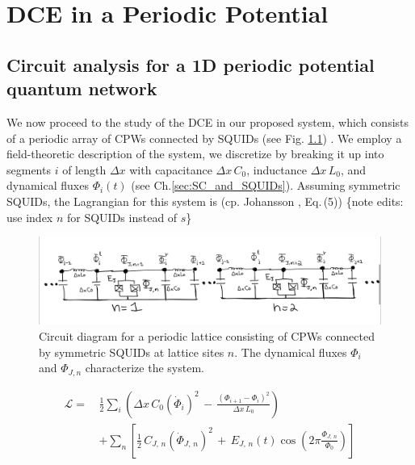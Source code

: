 \chapter{DCE in a Periodic Potential} \label{ch:system}


\section{Circuit analysis for a 1D periodic potential quantum network}\label{sec:circ_an}
%
\color{blue}
\noindent
We now proceed to the study of the DCE in our proposed system, which consists of a periodic array of CPWs connected by SQUIDs (see Fig. \ref{fig:circuit_diagram}) . We employ a field-theoretic description of the system, we discretize by breaking it up into segments $i$ of length $\Delta x$ with capacitance $\Delta x \, C_0$, inductance $\Delta x \, L_0$, and dynamical fluxes $\Phi_i(t)$ (see Ch.\ref{sec:SC_and_SQUIDs}).
Assuming symmetric SQUIDs, the Lagrangian for this system is (cp. Johansson \cite{Johansson2010_DCE}, Eq.\,(5))
\color{red} \{note edits: use index $n$ for SQUIDs instead of $s$\} \color{blue}
%
\begin{figure}[h]\label{fig:circuit_diagram}
    \centering
    \includegraphics[width=\textwidth, keepaspectratio]{figures/circuit_diagram.png}
    \caption{Circuit diagram for a periodic lattice consisting of CPWs connected by symmetric SQUIDs at lattice sites $n$. The dynamical fluxes $\Phi_i$ and $\Phi_{J,n}$ characterize the system.}
\end{figure}
%
\begin{equation} \label{eq:lagn1}
\begin{split}
\mathcal{L} = \, & \frac{1}{2} \sum_i \left( \Delta x \, C_{0} \left(\dot{\Phi}_{i}\right)^{2} \, - \, 
\frac{\left(\Phi_{i+1}-\Phi_{i}\right)^{2}}{\Delta x \, L_{0}} \right)  \\[2mm]
& + \sum_n \left[ \frac{1}{2} \, C_{J,\,n} \left(\dot{\Phi}_{J,\,n} \right)^{2} \, + \, 
E_{J,\,n}(t) \cos\left(2\pi \frac{\Phi_{J,\,n}}{\Phi_0} \right) \right]
\end{split}
\end{equation}
